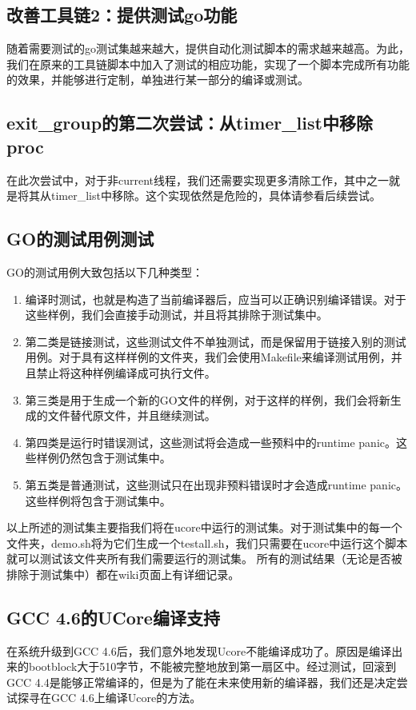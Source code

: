 \documentclass{article}
\begin{document}
\subsection{改善工具链2：提供测试go功能}
随着需要测试的go测试集越来越大，提供自动化测试脚本的需求越来越高。为此，我们在原来的工具链脚本中加入了测试的相应功能，实现了一个脚本完成所有功能的效果，并能够进行定制，单独进行某一部分的编译或测试。

\subsection{exit\_group的第二次尝试：从timer\_list中移除proc}
在此次尝试中，对于非current线程，我们还需要实现更多清除工作，其中之一就是将其从timer\_list中移除。这个实现依然是危险的，具体请参看后续尝试。

\subsection{GO的测试用例测试}
GO的测试用例大致包括以下几种类型：
\begin{enumerate}
  \item 编译时测试，也就是构造了当前编译器后，应当可以正确识别编译错误。对于这些样例，我们会直接手动测试，并且将其排除于测试集中。
  \item 第二类是链接测试，这些测试文件不单独测试，而是保留用于链接入别的测试用例。对于具有这样样例的文件夹，我们会使用Makefile来编译测试用例，并且禁止将这种样例编译成可执行文件。
  \item 第三类是用于生成一个新的GO文件的样例，对于这样的样例，我们会将新生成的文件替代原文件，并且继续测试。
  \item 第四类是运行时错误测试，这些测试将会造成一些预料中的runtime panic。这些样例仍然包含于测试集中。
  \item 第五类是普通测试，这些测试只在出现非预料错误时才会造成runtime panic。这些样例将包含于测试集中。
\end{enumerate}
以上所述的测试集主要指我们将在ucore中运行的测试集。对于测试集中的每一个文件夹，demo.sh将为它们生成一个testall.sh，我们只需要在ucore中运行这个脚本就可以测试该文件夹所有我们需要运行的测试集。
所有的测试结果（无论是否被排除于测试集中）都在wiki页面上有详细记录。

\subsection{GCC 4.6的UCore编译支持}
在系统升级到GCC 4.6后，我们意外地发现Ucore不能编译成功了。原因是编译出来的bootblock大于510字节，不能被完整地放到第一扇区中。经过测试，回滚到GCC 4.4是能够正常编译的，但是为了能在未来使用新的编译器，我们还是决定尝试探寻在GCC 4.6上编译Ucore的方法。
\end{document}
